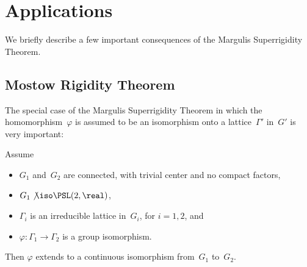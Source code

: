 \begin{exercises}

\end{exercises}





\section{Applications}

We briefly describe a few important consequences of the Margulis Superrigidity Theorem.

\subsection{Mostow Rigidity Theorem}
\label{StateMostowSubsect}

The special case of the Margulis Superrigidity Theorem  in which the homomorphism~$\varphi$ is assumed to be an isomorphism onto a lattice~$\Gamma'$ in~$G'$ is very important:

\begin{thm} \label{MostowRigidityIrred}
Assume
\noprelistbreak
	\begin{itemize}
	\item $G_1$ and~$G_2$ are connected, with trivial center and no compact factors,
	\item $G_1 \not\iso \PSL(2,\real)$,
	\item $\Gamma_i$ is an irreducible lattice in~$G_i$, for $i = 1,2$,
	and 
	\item $\varphi \colon \Gamma_1 \to \Gamma_2$ is a group isomorphism.
	\end{itemize}
Then $\varphi$ extends to a continuous isomorphism from~$G_1$ to~$G_2$.
\end{thm}


